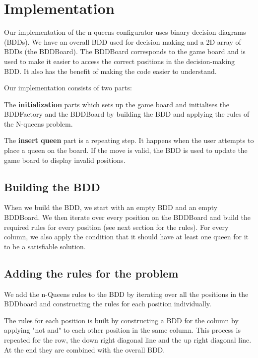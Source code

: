\section{Implementation}
\label{Implementation}
Our implementation of the n-queens configurator uses binary decision diagrams (BDDs). We have an overall BDD used for decision making and a 2D array of BDDs (the BDDBoard). The BDDBoard corresponds to the game board and is used to make it easier to access the correct positions in the decision-making BDD. It also has the benefit of making the code easier to understand.

Our implementation consists of two parts:
\begin{my_enumerate}

	\item The \textbf{initialization} parts which sets up the game board and initialises the BDDFactory and the BDDBoard by building the BDD and applying the rules of the N-queens problem.

	\item The \textbf{insert queen} part is a repeating step. It happens when the user attempts to place a queen on the board. If the move is valid, the BDD is used to update the game board to display invalid positions.

\end{my_enumerate}

\subsection{Building the BDD}

When we build the BDD, we start with an empty BDD and an empty BDDBoard. We then iterate over every position on the BDDBoard and build the required rules for every position (see next section for the rules). For every column, we also apply the condition that it should have at least one queen for it to be a satisfiable solution.

\subsection{Adding the rules for the problem}
We add the n-Queens rules to the BDD by iterating over all the positions in the BDDboard and constructing the rules for each position individually.

The rules for each position is built by constructing a BDD for the column by applying "not and" to each other position in the same column. This process is repeated for the row, the down right diagonal line and the up right diagonal line. At the end they are combined with the overall BDD.

